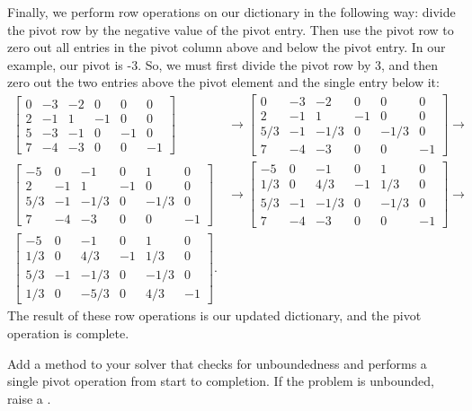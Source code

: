 Finally, we perform row operations on our dictionary in the following way: divide the pivot row by the negative value of the pivot entry.
Then use the pivot row to zero out all entries in the pivot column above and below the pivot entry.
In our example, our pivot is -3. So, we must first divide the pivot row by 3, and then zero out the two entries above the pivot element and the single entry below it:
\begin{align*}
\begin{bmatrix}
    0 & -3 & -2 & 0 & 0 & 0\\
    2 & -1 & 1 & -1 & 0 & 0\\
    5 & -3 & -1 & 0 & -1 & 0\\
    7 & -4 & -3 & 0 & 0 & -1
    \end{bmatrix} &\rightarrow
\begin{bmatrix}
    0 & -3 & -2 & 0 & 0 & 0\\
    2 & -1 & 1 & -1 & 0 & 0\\
    5/3 & -1 & -1/3 & 0 & -1/3 & 0\\
    7 & -4 & -3 & 0 & 0 & -1
    \end{bmatrix}\rightarrow\\
\begin{bmatrix}
    -5 & 0 & -1 & 0 & 1 & 0\\
    2 & -1 & 1 & -1 & 0 & 0\\
    5/3 & -1 & -1/3 & 0 & -1/3 & 0\\
    7 & -4 & -3 & 0 & 0 & -1
    \end{bmatrix} &\rightarrow
\begin{bmatrix}
    -5 & 0 & -1 & 0 & 1 & 0\\
    1/3 & 0 & 4/3 & -1 & 1/3 & 0\\
    5/3 & -1 & -1/3 & 0 & -1/3 & 0\\
    7 & -4 & -3 & 0 & 0 & -1
    \end{bmatrix}\rightarrow\\
\begin{bmatrix}
    -5 & 0 & -1 & 0 & 1 & 0\\
    1/3 & 0 & 4/3 & -1 & 1/3 & 0\\
    5/3 & -1 & -1/3 & 0 & -1/3 & 0\\
    1/3 & 0 & -5/3 & 0 & 4/3 & -1
    \end{bmatrix}.
\end{align*}
The result of these row operations is our updated dictionary, and the pivot operation is complete.

\begin{problem} %
Add a method to your solver that checks for unboundedness and performs a single pivot operation from start to completion.
If the problem is unbounded, raise a .
\end{problem}

